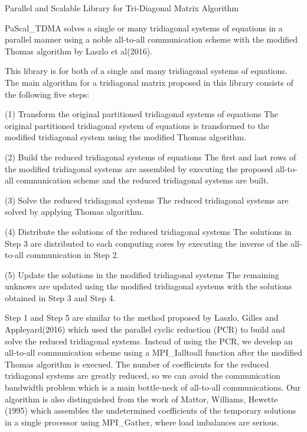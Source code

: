 Parallel and Scalable Library for Tri-\/\+Diagonal Matrix Algorithm

Pa\+Scal\+\_\+\+T\+D\+MA solves a single or many tridiagonal systems of equations in a parallel manner using a noble all-\/to-\/all communication scheme with the modified Thomas algorithm by Laszlo et al(2016).

This library is for both of a single and many tridiagonal systems of equations. The main algorithm for a tridiagonal matrix proposed in this library consists of the following five steps\+:


\begin{DoxyItemize}
\item (1) Transform the original partitioned tridiagonal systems of equations The original partitioned tridiagonal system of equations is transformed to the modified tridiagonal system using the modified Thomas algorithm.
\item (2) Build the reduced tridiagonal systems of equations The first and last rows of the modified tridiagonal systems are assembled by executing the proposed all-\/to-\/all communication scheme and the reduced tridiagonal systems are built.
\item (3) Solve the reduced tridiagonal systems The reduced tridiagonal systems are solved by applying Thomas algorithm.
\item (4) Distribute the solutions of the reduced tridiagonal systems The solutions in Step 3 are distributed to each computing cores by executing the inverse of the all-\/to-\/all communication in Step 2.
\item (5) Update the solutions in the modified tridiagonal systems The remaining unknows are updated using the modified tridiagonal systems with the solutions obtained in Step 3 and Step 4.
\end{DoxyItemize}

Step 1 and Step 5 are similar to the method proposed by Laszlo, Gilles and Appleyard(2016) which used the parallel cyclic reduction (P\+CR) to build and solve the reduced tridiagonal systems. Instead of using the P\+CR, we develop an all-\/to-\/all communication scheme using a M\+P\+I\+\_\+\+Ialltoall function after the modified Thomas algorithm is execued. The number of coefficients for the reduced tridiagonal systems are greatly reduced, so we can avoid the communication bandwidth problem which is a main bottle-\/neck of all-\/to-\/all communications. Our algorithm is also distinguished from the work of Mattor, Williams, Hewette (1995) which assembles the undetermined coefficients of the temporary solutions in a single processor using M\+P\+I\+\_\+\+Gather, where load imbalances are serious.

